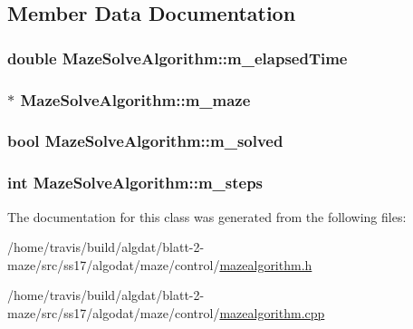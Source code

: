 \subsection{Member Data Documentation}
\hypertarget{class_maze_solve_algorithm_a1ca82a6e1f52cdb2f6bc3ea7b332e2f2}{
\subsubsection[{m\-\_\-elapsed\-Time}]{\setlength{\rightskip}{0pt plus 5cm}double Maze\-Solve\-Algorithm\-::m\-\_\-elapsed\-Time}}\label{class_maze_solve_algorithm_a1ca82a6e1f52cdb2f6bc3ea7b332e2f2}
\hypertarget{class_maze_solve_algorithm_a22988c0e0a5eaea83ce360be8e3a9ebb}{
\subsubsection[{m\-\_\-maze}]{$\ast$ Maze\-Solve\-Algorithm\-::m\-\_\-maze}}\label{class_maze_solve_algorithm_a22988c0e0a5eaea83ce360be8e3a9ebb}
\hypertarget{class_maze_solve_algorithm_a1c7f66e1bc5c91f9d007ba0a79d239d0}{
\subsubsection[{m\-\_\-solved}]{\setlength{\rightskip}{0pt plus 5cm}bool Maze\-Solve\-Algorithm\-::m\-\_\-solved}}\label{class_maze_solve_algorithm_a1c7f66e1bc5c91f9d007ba0a79d239d0}
\hypertarget{class_maze_solve_algorithm_a16f9e281c4bcdc47575d7b75c244652e}{
\subsubsection[{m\-\_\-steps}]{\setlength{\rightskip}{0pt plus 5cm}int Maze\-Solve\-Algorithm\-::m\-\_\-steps}}\label{class_maze_solve_algorithm_a16f9e281c4bcdc47575d7b75c244652e}


The documentation for this class was generated from the following files\-:\begin{DoxyCompactItemize}
\item 
/home/travis/build/algdat/blatt-\/2-\/maze/src/ss17/algodat/maze/control/\hyperlink{mazealgorithm_8h}{mazealgorithm.\-h}\item 
/home/travis/build/algdat/blatt-\/2-\/maze/src/ss17/algodat/maze/control/\hyperlink{mazealgorithm_8cpp}{mazealgorithm.\-cpp}\end{DoxyCompactItemize}
